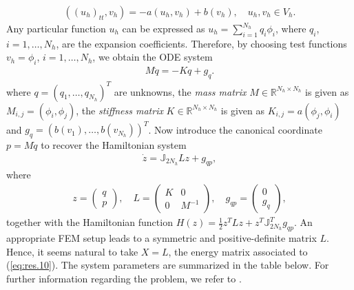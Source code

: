 \begin{eqnarray} \label{eq:res.8}
	((u_h)_{tt},v_h) = - a(u_h,v_h) + b(v_h),\quad u_h,v_h\in V_h.
\end{eqnarray}
Any particular function $u_h$ can be expressed as $u_h = \sum_{i=1}^{N_h} q_i \phi_i$, where $q_i$, $i=1,\dots,N_h$, are the expansion coefficients. Therefore, by choosing test functions $v_h = \phi_i$, $i=1,\dots,N_h$, we obtain the ODE system
\begin{eqnarray} \label{eq:res.9}
	M\ddot q = -K q + g_{q}.
\end{eqnarray}
where $q=(q_1,\dots,q_{N_h})^T$ are unknowns, the \emph{mass matrix} $M\in \mathbb R^{N_h\times N_h}$ is given as $M_{i,j} = (\phi_i,\phi_j)$, the \emph{stiffness matrix} $K\in \mathbb R^{N_h\times N_h}$ is given as $K_{i,j} = a(\phi_j,\phi_i)$ and $g_q=(b(v_1),\dots,b(v_{N_h}))^T$. Now introduce the canonical coordinate $p = M\dot q$ to recover the Hamiltonian system
\begin{eqnarray} \label{eq:res.10}
	\dot z = \mathbb J_{2N_h} Lz + g_{qp},
\end{eqnarray}
where
\begin{eqnarray} \label{eq:res.11}
	z = 
	\begin{pmatrix}
	q \\
	p	
	\end{pmatrix}, \quad 
	L = 
	\begin{pmatrix}
	K & 0 \\
	0 & M^{-1}
	\end{pmatrix}, \quad
	g_{qp} =
	\begin{pmatrix}
	0 \\
	g_q
	\end{pmatrix},
\end{eqnarray}
together with the Hamiltonian function $H(z) = \frac{1}{2} z^TLz + z^T \mathbb J_{2N_h}^T g_{qp}$. An appropriate FEM setup leads to a symmetric and positive-definite matrix $L$. Hence, it seems natural to take $X=L$, the energy matrix associated to (\ref{eq:res.10}). The system parameters are summarized in the table below. For further information regarding the problem, we refer to \cite{langtangen2017solving}.

